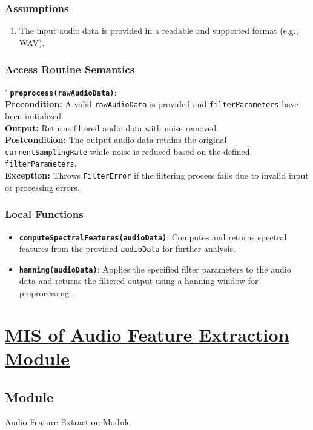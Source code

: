 \documentclass[12pt, titlepage]{article}
\begin{document}
\subsubsection{Assumptions}
\begin{enumerate}
    \item The input audio data is provided in a readable and supported format (e.g., WAV).
\end{enumerate}

\subsubsection{Access Routine Semantics}'
\noindent \textbf{\texttt{preprocess(rawAudioData)}}: \\
\textbf{Precondition:} A valid \texttt{rawAudioData} is provided and \texttt{filterParameters} have been initialized. \\
\textbf{Output:} Returns filtered audio data with noise removed. \\
\textbf{Postcondition:} The output audio data retains the original \texttt{currentSamplingRate} while noise is reduced based on the defined \texttt{filterParameters}. \\
\textbf{Exception:} Throws \texttt{FilterError} if the filtering process fails due to invalid input or processing errors.

\subsubsection{Local Functions}
\begin{itemize}
    \item \textbf{\texttt{computeSpectralFeatures(audioData)}}: Computes and returns spectral features from the provided \texttt{audioData} for further analysis.
    \item \textbf{\texttt{hanning(audioData)}}: Applies the specified filter parameters to the audio data and returns the filtered output using a hanning window for preprocessing \cite{hanning}.
\end{itemize}


\section{\hyperref[mAFE]{MIS of Audio Feature Extraction Module}} \label{M5}  

\subsection{Module}  
Audio Feature Extraction Module  
\end{document}
